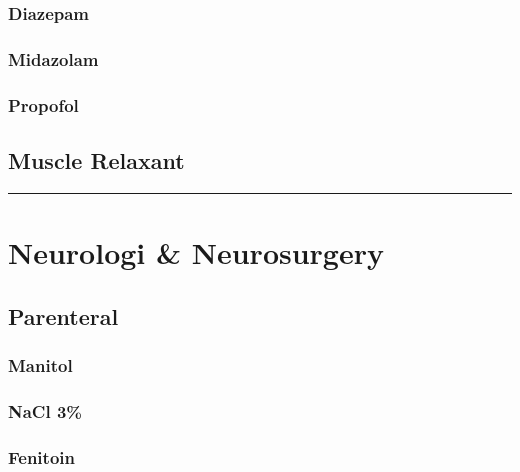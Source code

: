 \documentclass[
]{book}
\begin{document}
\hypertarget{diazepam}{%
\subsubsection{Diazepam}\label{diazepam}}

\hypertarget{midazolam-1}{%
\subsubsection{Midazolam}\label{midazolam-1}}

\hypertarget{propofol-1}{%
\subsubsection{Propofol}\label{propofol-1}}

\hypertarget{muscle-relaxant}{%
\subsection{Muscle Relaxant}\label{muscle-relaxant}}

\begin{center}\rule{0.5\linewidth}{0.5pt}\end{center}

\hypertarget{neurologi-neurosurgery}{%
\section{Neurologi \& Neurosurgery}\label{neurologi-neurosurgery}}

\hypertarget{parenteral-4}{%
\subsection{Parenteral}\label{parenteral-4}}

\hypertarget{manitol}{%
\subsubsection{Manitol}\label{manitol}}

\hypertarget{nacl-3}{%
\subsubsection{NaCl 3\%}\label{nacl-3}}

\hypertarget{fenitoin}{%
\subsubsection{Fenitoin}\label{fenitoin}}
\end{document}
